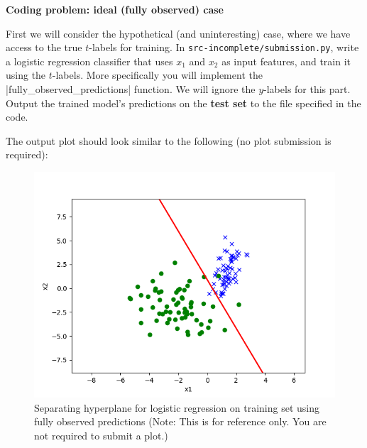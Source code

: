 \item {} \textbf{Coding problem: ideal (fully observed) case}

First we will consider the hypothetical (and uninteresting) case, where we have access to the true
$t$-labels for training. In \texttt{src-incomplete/submission.py}, write a logistic
regression classifier that uses $x_1$ and $x_2$ as input features, and train it
using the $t$-labels. More specifically you will implement the |fully_observed_predictions| function.
We will ignore the $y$-labels for this part. Output the
trained model's predictions on the \textbf{test set} to the file specified in the code.

The output plot should look similar to the following (no plot submission is required):
\begin{figure}[H]
	\centering
	\vspace{2mm}
	\includegraphics[width=0.5\linewidth]{02-posonly/posonly_true_pred.png}
    \caption{Separating hyperplane for logistic regression on training set using fully observed predictions (Note: This is for reference only.  You are not required to submit a plot.)}
\end{figure}